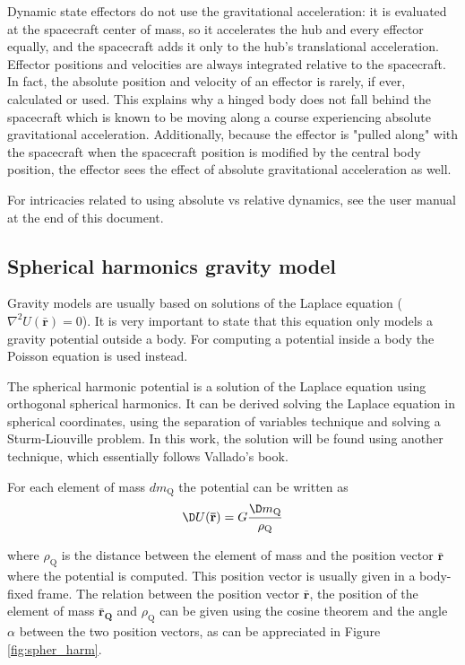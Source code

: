 Dynamic state effectors do not use the gravitational acceleration: it is evaluated at the spacecraft center of mass, so it accelerates the hub and every effector equally, and the spacecraft adds it only to the hub's translational acceleration. Effector positions and velocities are always integrated relative to the spacecraft. In fact, the absolute position and velocity of an effector is rarely, if ever, calculated or used. This explains why a hinged body does not fall behind the spacecraft which is known to be moving along a course experiencing absolute gravitational acceleration. Additionally, because the effector is "pulled along" with the spacecraft when the spacecraft position is modified by the central body position, the effector sees the effect of absolute gravitational acceleration as well.

For intricacies related to using absolute vs relative dynamics, see the user manual at the end of this document.

\subsection{Spherical harmonics gravity model}

Gravity models are usually based on solutions of the Laplace equation ($\nabla^2 U(\mathbf{\bar r}) = 0$). It is very important to state that this equation only models a gravity potential outside a body. For computing a potential inside a body the Poisson equation is used instead.

The spherical harmonic potential is a solution of the Laplace equation using orthogonal spherical harmonics. It can be derived solving the Laplace equation in spherical coordinates, using the separation of variables technique and solving a Sturm-Liouville problem. In this work, the solution will be found using another technique, which essentially follows Vallado's book\cite{vallado2013}.

For each element of mass $d m_\text{Q}$ the potential can be written as
\begin{equation}
\D U(\mathbf{\bar r}) = G \frac{\D m_\text{Q}}{\rho_\text{Q}}
\end{equation}

where $\rho_\text{Q}$ is the distance between the element of mass and the position vector $\mathbf{\bar r}$ where the potential is computed. This position vector is usually given in a body-fixed frame. The relation between the position vector $\mathbf{\bar r}$, the position of the element of mass $\mathbf{\bar r_\text{Q}}$ and $\rho_\text{Q}$ can be given using the cosine theorem and the angle $\alpha$ between the two position vectors, as can be appreciated in Figure \ref{fig:spher_harm}.

